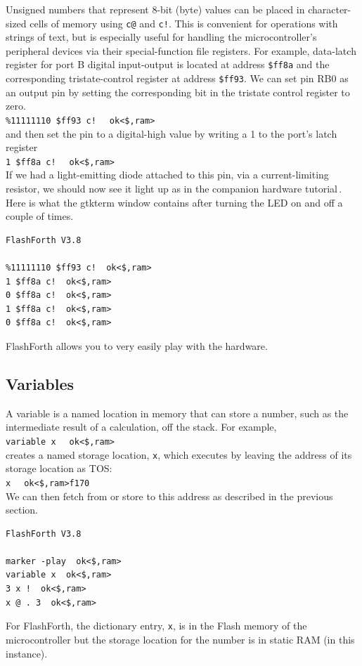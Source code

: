 \documentclass[12pt,a4paper]{article}
\begin{document}
\medskip
Unsigned numbers that represent 8-bit (byte) values can be placed in character-sized cells
of memory using \verb?c@? and \verb?c!?.
This is convenient for operations with strings of text, but is especially useful
for handling the microcontroller's peripheral devices via their special-function
file registers.
For example, data-latch register for port B digital input-output 
is located at address \verb!$ff8a! 
and the corresponding tristate-control register at address \verb!$ff93!.
We can set pin RB0 as an output pin by setting the corresponding bit in the 
tristate control register to zero. \vspace{7pt} \\
\verb?%11111110 $ff93 c! ? \fbox{$\hookleftarrow$} \verb! ok<$,ram>! \vspace{7pt} \\
and then set the pin to a digital-high value by writing a 1 to the port's latch register \vspace{7pt} \\
\verb?1 $ff8a c! ? \fbox{$\hookleftarrow$} \verb! ok<$,ram>! \vspace{7pt} \\
If we had a light-emitting diode attached to this pin, via a current-limiting resistor,
we should now see it light up as in the companion hardware tutorial\,\cite{jacobs_2012b}.
Here is what the gtkterm window contains after turning the LED on and off a couple of times.
\begin{verbatim}
FlashForth V3.8

%11111110 $ff93 c!  ok<$,ram>
1 $ff8a c!  ok<$,ram>
0 $ff8a c!  ok<$,ram>
1 $ff8a c!  ok<$,ram>
0 $ff8a c!  ok<$,ram>
\end{verbatim}
FlashForth allows you to very easily play with the hardware.


\medskip
\subsection{Variables}
\label{sec:variables}
%
A variable is a named location in memory that can store a number,
such as the intermediate result of a calculation, off the stack.
For example, \vspace{7pt} \\
\verb?variable x ? \fbox{$\hookleftarrow$} \verb! ok<$,ram>! \vspace{7pt} \\
creates a named storage location, \verb!x!, which executes by leaving the address
of its storage location as TOS: \vspace{7pt} \\
\verb?x ? \fbox{$\hookleftarrow$} \verb! ok<$,ram>f170! \vspace{7pt} \\
We can then fetch from or store to this address as described in the previous section.
\begin{verbatim}
FlashForth V3.8

marker -play  ok<$,ram>
variable x  ok<$,ram>
3 x !  ok<$,ram>
x @ . 3  ok<$,ram>
\end{verbatim}
For FlashForth, the dictionary entry, \verb!x!, 
is in the Flash memory of the microcontroller but the
storage location for the number is in static RAM (in this instance).
\end{document}
